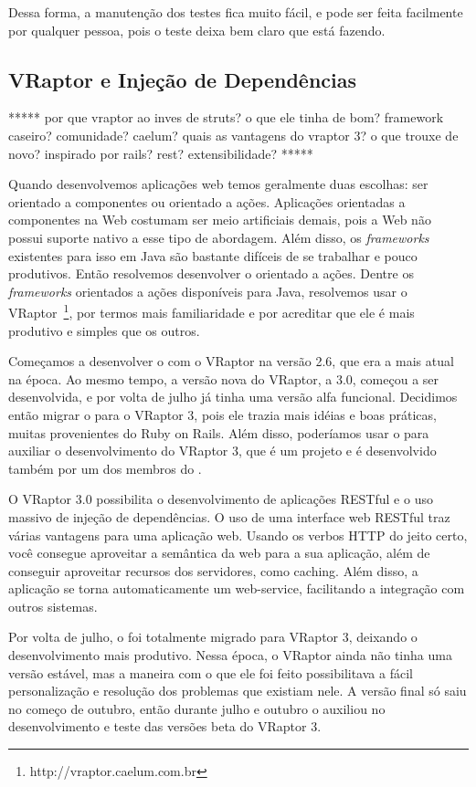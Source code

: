 Dessa forma, a manutenção dos testes fica muito fácil, e pode ser feita facilmente por qualquer pessoa, pois o 
teste deixa bem claro que está fazendo.


\subsection{VRaptor e Injeção de Dependências}

*****
por que vraptor ao inves de struts? o que ele tinha de bom? framework caseiro? comunidade? caelum?
quais as vantagens do vraptor 3? o que trouxe de novo? inspirado por rails? rest? extensibilidade?
*****

Quando desenvolvemos aplicações web temos geralmente duas escolhas: ser orientado a componentes ou orientado
a ações. Aplicações orientadas a componentes na Web costumam ser meio artificiais demais, pois a Web não
possui suporte nativo a esse tipo de abordagem. Além disso, os \textit{frameworks} existentes para isso em
Java são bastante difíceis de se trabalhar e pouco produtivos. Então resolvemos desenvolver o \calopsita orientado
a ações. Dentre os \textit{frameworks} orientados a ações disponíveis para Java, resolvemos usar o 
VRaptor~\footnote{http://vraptor.caelum.com.br}, por termos mais familiaridade e por acreditar que ele é mais 
produtivo e simples que os outros.

Começamos a desenvolver o \calopsita com o VRaptor na versão 2.6, que era a mais atual na época. 
Ao mesmo tempo, a versão nova do VRaptor, a 3.0, começou a ser desenvolvida, e por volta de julho já tinha 
uma versão alfa funcional. Decidimos então migrar o \calopsita para o VRaptor 3, pois ele trazia mais idéias
e boas práticas, muitas provenientes do Ruby on Rails. Além disso, poderíamos usar o \calopsita para auxiliar
o desenvolvimento do VRaptor 3, que é um projeto \opensource e é desenvolvido também por um dos membros do
\calopsita.

O VRaptor 3.0 possibilita o desenvolvimento de aplicações RESTful \cite{rest}
e o uso massivo de injeção de dependências\cite{di}. O uso de uma interface web RESTful traz várias vantagens para 
uma aplicação web. Usando os verbos HTTP do jeito certo, você consegue aproveitar a semântica da web para a 
sua aplicação, além de conseguir aproveitar recursos dos servidores, como caching. Além disso, a aplicação 
se torna automaticamente um web-service, facilitando a integração com outros sistemas.

Por volta de julho, o \calopsita foi totalmente migrado para VRaptor 3, deixando o desenvolvimento mais produtivo. 
Nessa época, o VRaptor ainda não tinha uma versão estável, mas a maneira com o que ele foi feito possibilitava a fácil
personalização e resolução dos problemas que existiam nele. A versão final só saiu no começo de outubro, então durante 
julho e outubro o \calopsita auxiliou no desenvolvimento e teste das versões beta do VRaptor 3.

